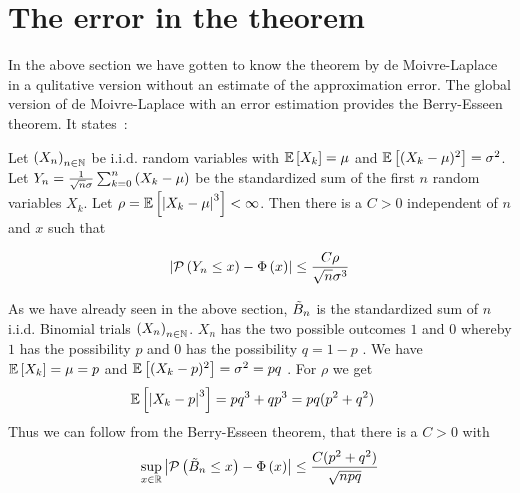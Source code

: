 \section{The error in the theorem}


In the above section we have gotten to know the theorem by de Moivre-Laplace in a qulitative version without an estimate of the approximation error. The global version of de Moivre-Laplace with an error estimation provides the Berry-Esseen theorem. It states~\cite[70-71]{nourdin}\cite{wiki:berry}:

\begin{theorem}
  Let $\left({X_n}\right)_{{n}\in\mathbb N}$ be i.i.d. random variables with $\mathbb E\left[{X_k}\right]=\mu$ and $\mathbb E\left[{(X_k-\mu)^2}\right]=\sigma^2$. Let $Y_n = \frac 1{\sqrt{n}\sigma} \sum_{k=0}^n \left( {X_k-\mu} \right)$ be the standardized sum of the first $n$ random variables $X_k$. Let $\rho = \mathbb E\left[{\left|{X_k-\mu}\right|^3}\right] < \infty$. Then there is a $C>0$ independent of $n$ and $x$ such that

  \begin{align}
    \left|{\mathcal P\left({Y_n \le x}\right) - \Phi\left( {x} \right)}\right| \le \frac{C \rho}{\sqrt n \sigma^3}
  \end{align}
\end{theorem}



As we have already seen in the above section, $\tilde B_{n}$ is the standardized sum of $n$ i.i.d. Binomial trials $\left({X_n}\right)_{{n}\in\mathbb N}$. $X_n$ has the two possible outcomes $1$ and $0$ whereby $1$ has the possibility $p$ and $0$ has the possibility $q=1-p$ \cite[p. 32]{georgii}\cite{wiki:bernoulli_distribution}. We have $\mathbb E\left[{X_k}\right] = \mu = p$ and $\mathbb E\left[{(X_k-p)^2}\right]=\sigma^2=pq$ \cite{wiki:bernoulli_distribution}\cite[p. 112]{georgii}. For $\rho$ we get
\begin{align}
  \mathbb E\left[{\left|{X_k-p}\right|^3}\right] &= p q^3 + q p^3 = pq (p^2+q^2)
\end{align}
Thus we can follow from the Berry-Esseen theorem, that there is a $C>0$ with
\begin{align}
  \sup_{x\in\mathbb R} \left|{\mathcal P\left({\tilde B_{n} \le x}\right)-\Phi\left( {x} \right)}\right| \le \frac{C(p^2+q^2)}{\sqrt{npq}}
\end{align}

